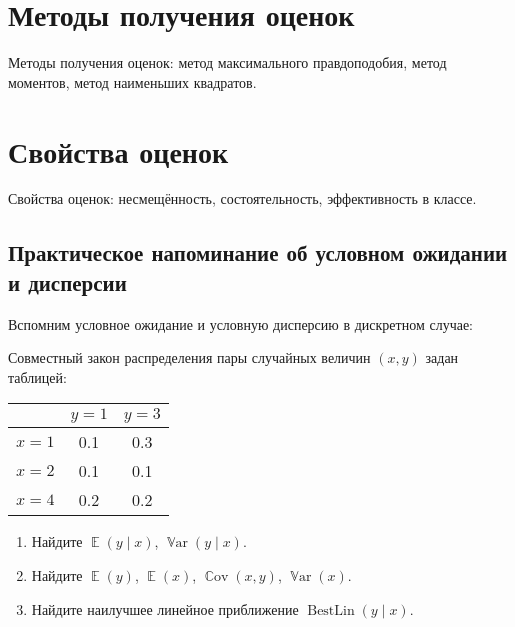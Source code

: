 \documentclass[12pt]{article}
\DeclareMathOperator{\Cov}{\mathbb{C}ov}
\DeclareMathOperator{\Var}{\mathbb{V}ar}
\DeclareMathOperator{\BestLin}{BestLin}
\DeclareMathOperator{\E}{\mathbb{E}}
\newenvironment{sol}{}{}
\begin{document}

\tableofcontents{}



\section{Методы получения оценок}

Методы получения оценок: метод максимального правдоподобия, метод моментов, метод наименьших квадратов.


\section{Свойства оценок}
Свойства оценок: несмещённость, состоятельность, эффективность в классе.

\subsection{Практическое напоминание об условном ожидании и дисперсии}

Вспомним условное ожидание и условную дисперсию в дискретном случае:
\begin{problem}
Совместный закон распределения пары случайных величин $(x, y)$ задан таблицей:

\begin{tabular}{ccc}
\toprule
     & $y = 1$ & $y = 3$ \\
\midrule
$x = 1$ & 0.1 & 0.3 \\
$x = 2$ & 0.1 & 0.1 \\
$x = 4$ & 0.2 & 0.2 \\
\bottomrule
\end{tabular}

\begin{enumerate}
    \item Найдите $\E(y \mid x)$, $\Var(y \mid x)$.
    \item Найдите $\E(y)$, $\E(x)$, $\Cov(x, y)$, $\Var(x)$.
    \item Найдите наилучшее линейное приближение $\BestLin(y \mid x)$.
\end{enumerate}

    \begin{sol}
    \end{sol}
\end{problem}
\end{document}
